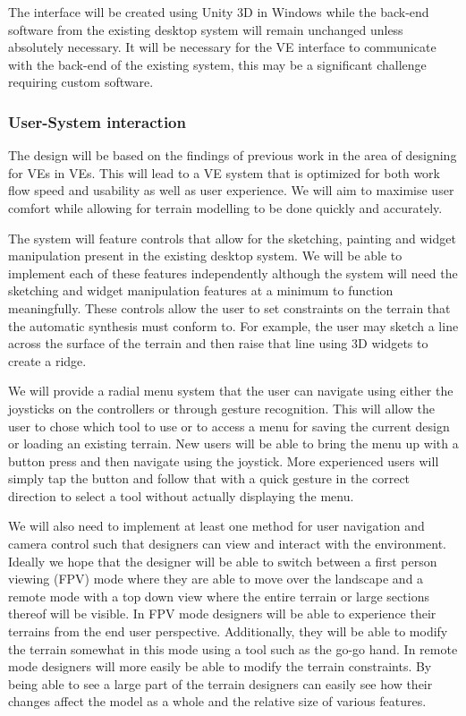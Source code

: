 \documentclass{sig-alternate-05-2015}
\begin{document}
The interface will be created using Unity 3D in Windows while the back-end software from the existing desktop system will remain unchanged unless absolutely necessary. It will be necessary for the VE interface to communicate with the back-end of the existing system, this may be a significant challenge requiring custom software.

\subsubsection{User-System interaction}
The design will be based on the findings of previous work in the area of designing for VEs in VEs. This will lead to a VE system that is optimized for both work flow speed and usability as well as user experience. We will aim to maximise user comfort while allowing for terrain modelling to be done quickly and accurately.

The system will feature controls that allow for the sketching, painting and widget manipulation present in the existing desktop system. We will be able to implement each of these features independently although the system will need the sketching and widget manipulation features at a minimum to function meaningfully. These controls allow the user to set constraints on the terrain that the automatic synthesis must conform to. For example, the user may sketch a line across the surface of the terrain and then raise that line using 3D widgets to create a ridge. 

We will provide a radial menu system that the user can navigate using either the joysticks on the controllers or through gesture recognition. This will allow the user to chose which tool to use or to access a menu for saving the current design or loading an existing terrain. New users will be able to bring the menu up with a button press and then navigate using the joystick. More experienced users will simply tap the button and follow that with a quick gesture in the correct direction to select a tool without actually displaying the menu.

We will also need to implement at least one method for user navigation and camera control such that designers can view and interact with the environment. Ideally we hope that the designer will be able to switch between a first person viewing (FPV) mode where they are able to move over the landscape and a remote mode with a top down view where the entire terrain or large sections thereof will be visible. In FPV mode designers will be able to experience their terrains from the end user perspective. Additionally, they will be able to modify the terrain somewhat in this mode using a tool such as the go-go hand. In remote mode designers will more easily be able to modify the terrain constraints. By being able to see a large part of the terrain designers can easily see how their changes affect the model as a whole and the relative size of various features.
\end{document}

